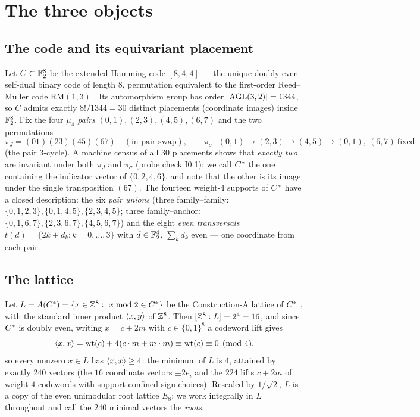 \section{The three objects}\label{sec:setup}

\subsection{The code and its equivariant placement}
Let $C\subset\mathbb F_2^8$ be the extended Hamming code $[8,4,4]$ --- the
unique doubly-even self-dual binary code of length $8$, permutation
equivalent to the first-order Reed--Muller code $\mathrm{RM}(1,3)$
\cite[Ch.~1, 13--14]{MS77}.  Its automorphism group has order
$|{\rm AGL}(3,2)|=1344$, so $C$ admits exactly
$8!/1344=30$ distinct placements (coordinate images) inside $\mathbb F_2^8$.
Fix the four \emph{$\mu_4$ pairs}
$(0,1),(2,3),(4,5),(6,7)$ and the two permutations
\[
\pi_J=(01)(23)(45)(67)\quad(\text{in-pair swap}),\qquad
\pi_\sigma:\ (0,1)\to(2,3)\to(4,5)\to(0,1),\ (6,7)\ \text{fixed}
\]
(the pair $3$-cycle).  A machine census of all $30$ placements shows
that \emph{exactly two} are invariant under both $\pi_J$ and
$\pi_\sigma$ (probe check I0.1); we call $C^{*}$ the one containing
the indicator vector of $\{0,2,4,6\}$, and note that the other is its
image under the single transposition $(67)$.  The fourteen weight-$4$
supports of $C^{*}$ have a closed description: the six
\emph{pair unions} (three family--family:
$\{0,1,2,3\},\{0,1,4,5\},\{2,3,4,5\}$; three family--anchor:
$\{0,1,6,7\},\{2,3,6,7\},\{4,5,6,7\}$) and the eight \emph{even
transversals} $t(d)=\{2k+d_k:k=0,\dots,3\}$ with
$d\in\mathbb F_2^4$, $\sum_kd_k$ even --- one coordinate from each pair.

\subsection{The lattice}
Let $L=A(C^{*})=\{x\in\mathbb Z^8:\ x\bmod 2\in C^{*}\}$ be the Construction-A
lattice of $C^{*}$ \cite[Ch.~5]{CS99}, with the standard inner product
$\langle x,y\rangle$ of $\mathbb Z^8$.  Then $[\mathbb Z^8:L]=2^4=16$, and since $C^{*}$ is
doubly even, writing $x=c+2m$ with $c\in\{0,1\}^8$ a codeword lift
gives
\begin{equation}\label{eq:douleven}
\langle x,x\rangle=\operatorname{wt}(c)+4(c\cdot m+m\cdot m)\equiv\operatorname{wt}(c)\equiv0 \pmod 4 ,
\end{equation}
so every nonzero $x\in L$ has $\langle x,x\rangle\ge4$: the minimum of $L$ is
$4$, attained by exactly $240$ vectors (the $16$ coordinate vectors
$\pm2e_i$ and the $224$ lifts $c+2m$ of weight-$4$ codewords with
support-confined sign choices).  Rescaled by $1/\sqrt2$, $L$ is a copy
of the even unimodular root lattice $E_8$; we work integrally in $L$
throughout and call the $240$ minimal vectors the \emph{roots}.


